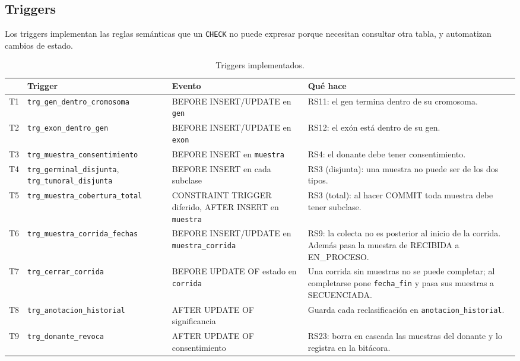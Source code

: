 \subsection{Triggers}\label{sec:triggers}

Los triggers implementan las reglas semánticas que un \texttt{CHECK} no puede expresar porque necesitan
consultar otra tabla, y automatizan cambios de estado.

\begin{table}[H]
\centering\small
\begin{tabular}{@{}>{\raggedright\arraybackslash}p{0.6cm}>{\raggedright\arraybackslash}p{4.4cm}>{\raggedright\arraybackslash}p{3.0cm}>{\raggedright\arraybackslash}p{6.4cm}@{}}
\toprule
 & Trigger & Evento & Qué hace \\
\midrule
T1 & \texttt{trg\_\allowbreak{}gen\_\allowbreak{}dentro\_\allowbreak{}cromosoma} & BEFORE INSERT/UPDATE en \texttt{gen} & RS11: el gen termina dentro de su cromosoma. \\
T2 & \texttt{trg\_\allowbreak{}exon\_\allowbreak{}dentro\_\allowbreak{}gen} & BEFORE INSERT/UPDATE en \texttt{exon} & RS12: el exón está dentro de su gen. \\
T3 & \texttt{trg\_\allowbreak{}muestra\_\allowbreak{}consentimiento} & BEFORE INSERT en \texttt{muestra} & RS4: el donante debe tener consentimiento. \\
T4 & \texttt{trg\_\allowbreak{}germinal\_\allowbreak{}disjunta}, \texttt{trg\_\allowbreak{}tumoral\_\allowbreak{}disjunta} & BEFORE INSERT en cada subclase & RS3 (disjunta): una muestra no puede ser de los dos tipos. \\
T5 & \texttt{trg\_\allowbreak{}muestra\_\allowbreak{}cobertura\_\allowbreak{}total} & CONSTRAINT TRIGGER diferido, AFTER INSERT en \texttt{muestra} & RS3 (total): al hacer COMMIT toda muestra debe tener subclase. \\
T6 & \texttt{trg\_\allowbreak{}muestra\_\allowbreak{}corrida\_\allowbreak{}fechas} & BEFORE INSERT/UPDATE en \texttt{muestra\_\allowbreak{}corrida} & RS9: la colecta no es posterior al inicio de la corrida. Además pasa la muestra de RECIBIDA a EN\_PROCESO. \\
T7 & \texttt{trg\_\allowbreak{}cerrar\_\allowbreak{}corrida} & BEFORE UPDATE OF estado en \texttt{corrida} & Una corrida sin muestras no se puede completar; al completarse pone \texttt{fecha\_\allowbreak{}fin} y pasa sus muestras a SECUENCIADA. \\
T8 & \texttt{trg\_\allowbreak{}anotacion\_\allowbreak{}historial} & AFTER UPDATE OF significancia & Guarda cada reclasificación en \texttt{anotacion\_\allowbreak{}historial}. \\
T9 & \texttt{trg\_\allowbreak{}donante\_\allowbreak{}revoca} & AFTER UPDATE OF consentimiento & RS23: borra en cascada las muestras del donante y lo registra en la bitácora. \\
\bottomrule
\end{tabular}
\caption{Triggers implementados.}
\end{table}

